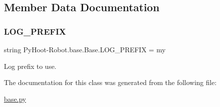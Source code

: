 \subsection{Member Data Documentation}
\mbox{\label{class_py_hoot-_robot_1_1base_1_1_base_a34c4b63214fb70e4165771ce77d0446b}} 
\subsubsection{\texorpdfstring{L\+O\+G\+\_\+\+P\+R\+E\+F\+IX}{LOG\_PREFIX}}
{\footnotesize\ttfamily string Py\+Hoot-\/Robot.\+base.\+Base.\+L\+O\+G\+\_\+\+P\+R\+E\+F\+IX = \textquotesingle{}my\textquotesingle{}\hspace{0.3cm}{\ttfamily [static]}}



Log prefix to use. 



The documentation for this class was generated from the following file\+:\begin{DoxyCompactItemize}
\item 
\hyperlink{base_8py}{base.\+py}\end{DoxyCompactItemize}
